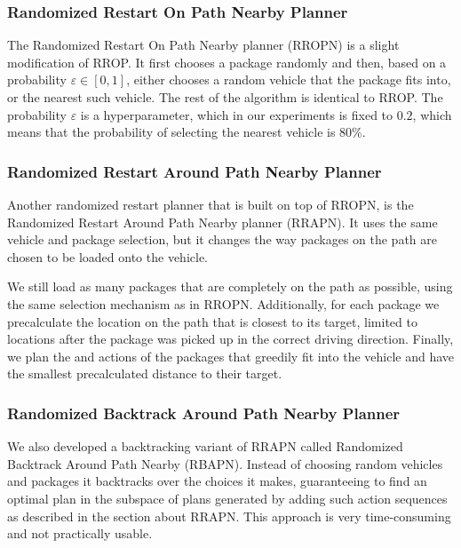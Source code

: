 \subsubsection{Randomized Restart On Path Nearby Planner}\label{rropn}

The Randomized Restart On Path Nearby planner (RROPN)
is a slight modification of RROP.
It first chooses a package randomly and then,
based on a probability $\varepsilon \in [0, 1]$,
either chooses a random vehicle that the package fits into,
or the nearest such vehicle.
The rest of the algorithm is identical to RROP.
The probability $\varepsilon$ is a hyperparameter,
which in our experiments is fixed to $0.2$,
which means that the probability of selecting the nearest vehicle is 80\%.

\subsubsection{Randomized Restart Around Path Nearby Planner}\label{rrapn}

Another randomized restart planner that is built on top of RROPN,
is the Randomized Restart Around Path Nearby planner (RRAPN).
It uses the same vehicle and package selection,
but it changes the way packages on the path are chosen to be loaded
onto the vehicle.

We still load as many packages that are completely on the path
as possible, using the same selection mechanism as in RROPN.
Additionally, for each package we precalculate
the location on the path that is closest to its target,
limited to locations after the package was picked up
in the correct driving direction.
Finally, we plan the \pickup{} and \drop{} actions of the
packages that greedily fit into the vehicle and
have the smallest precalculated distance to their target.

\subsubsection{Randomized Backtrack Around Path Nearby Planner}\label{rbapn}

We also developed a backtracking variant of RRAPN
called Randomized Backtrack Around Path Nearby (RBAPN).
Instead of choosing random vehicles and packages
it backtracks over the choices it makes,
guaranteeing to find an optimal
plan in the subspace of plans
generated by adding such action sequences as described in
the section about RRAPN. This approach is very
time-consuming and not practically usable.

